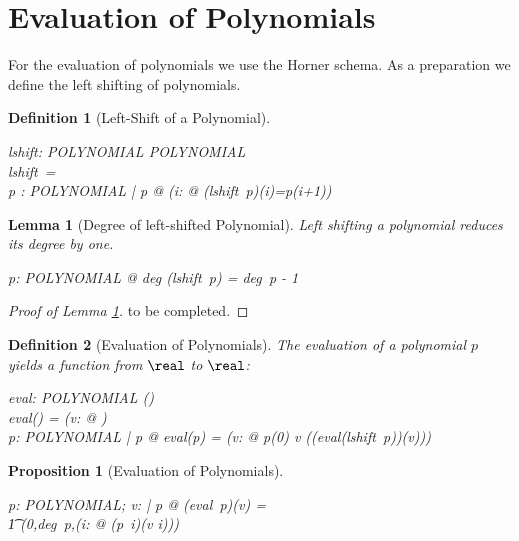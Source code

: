 \documentclass[12pt]{scrartcl}
\newtheorem{prop}{Proposition}[section]
\newtheorem{lemma}{Lemma}[section]
\newtheorem{zdef}{Definition}[section]
\begin{document}
\section{Evaluation of Polynomials}
\label{sec:evaluation}

For the evaluation of polynomials we use the Horner schema. As a
preparation we define the left shifting of polynomials.
 
\begin{zdef}[Left-Shift of a Polynomial]
  \label{zdef:left-shift}
  \begin{axdef}
    lshift: POLYNOMIAL \fun POLYNOMIAL \\
    \where
    lshift~\zeropol = \zeropol\\
    \forall p : POLYNOMIAL | p \neq \zeropol @ (\forall i: \nat @ (lshift~p)(i)=p(i+1))
  \end{axdef}
\end{zdef}

\begin{lemma}[Degree of left-shifted Polynomial]
  \label{lemma:degree-left-shift}
  Left shifting a polynomial reduces its degree by one.
  \begin{zed}
    \forall p: POLYNOMIAL @ deg (lshift~p) = deg~p - 1
  \end{zed}
\end{lemma}

\begin{proof}[Proof of Lemma \ref{lemma:degree-left-shift}]
  to be completed.
\end{proof}

\begin{zdef}[Evaluation of Polynomials]
  \label{zdef:evaluation}
  The evaluation of a polynomial $p$ yields a function from $\real$ to
  $\real$:
  \begin{axdef}
    eval: POLYNOMIAL \fun (\real \fun \real)\\
    \where
    eval(\zeropol) = (\lambda v: \real @ \azero)\\
    \forall p: POLYNOMIAL | p \neq \zeropol @ eval(p) = (\lambda v:
    \real @ p(0) \aplus v \amult ((eval(lshift~p))(v)))
  \end{axdef}
\end{zdef}


\begin{prop}[Evaluation of Polynomials]
  \label{prop:evalutation}
  \begin{zed}
    \forall p: POLYNOMIAL; v: \real | p \neq \zeropol @ (eval~p)(v) = \\
    \t1 \finsum(0,deg~p,(\lambda i: \nat @ (p~i)\amult(v \apwr i)))
  \end{zed}
\end{prop}
\end{document}
